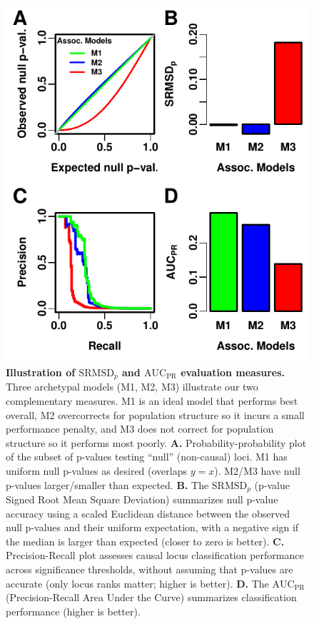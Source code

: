 \documentclass[11pt]{article}
\newcommand{\rmsd}{\text{SRMSD}_p}
\newcommand{\auc}{\text{AUC}_\text{PR}}
\begin{document}
\begin{figure}[bp!]
  \centering
  \includegraphics{sim-n1000-k10-f0.1-s0.5-g1/measures-illustration.pdf}
  \caption{
    {\bf Illustration of $\rmsd$ and $\auc$ evaluation measures.}
    Three archetypal models (M1, M2, M3) illustrate our two complementary measures.
    M1 is an ideal model that performs best overall, M2 overcorrects for population structure so it incurs a small performance penalty, and M3 does not correct for population structure so it performs most poorly.
    \textbf{A.}
    Probability-probability plot of the subset of p-values testing ``null'' (non-causal) loci.
    M1 has uniform null p-values as desired (overlaps $y=x$).
    M2/M3 have null p-values larger/smaller than expected.
    \textbf{B.}
    The $\rmsd$ (p-value Signed Root Mean Square Deviation) summarizes null p-value accuracy using a scaled Euclidean distance between the observed null p-values and their uniform expectation, with a negative sign if the median is larger than expected (closer to zero is better).
    \textbf{C.}
    Precision-Recall plot assesses causal locus classification performance across significance thresholds, without assuming that p-values are accurate (only locus ranks matter; higher is better).
    \textbf{D.}
    The $\auc$ (Precision-Recall Area Under the Curve) summarizes classification performance (higher is better).
  }
  \label{fig:measures_illustration}
\end{figure}
\end{document}

